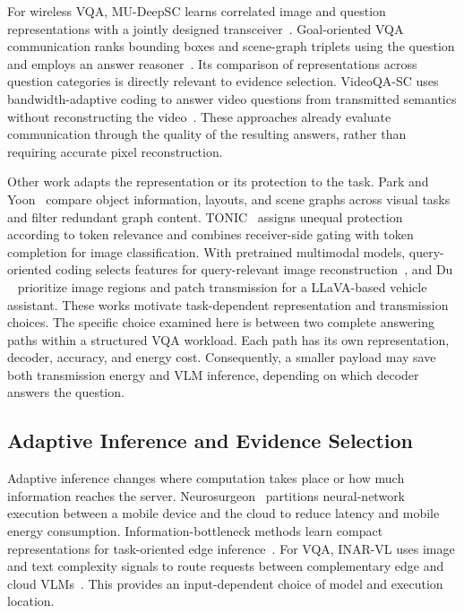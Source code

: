 For wireless VQA, MU-DeepSC learns correlated image and question
representations with a jointly designed
transceiver~\cite{xie2022mudeepscwcl,xie2021mudeepsc}.
Goal-oriented VQA communication ranks bounding boxes and scene-graph
triplets using the question and employs an answer
reasoner~\cite{liu2024gosg}. Its comparison of representations across
question categories is directly relevant to evidence selection.
VideoQA-SC uses bandwidth-adaptive coding to answer video questions
from transmitted semantics without reconstructing the
video~\cite{guo2025videoqasc}. These approaches already evaluate
communication through the quality of the resulting answers, rather
than requiring accurate pixel reconstruction.

Other work adapts the representation or its protection to the task.
Park and Yoon~\cite{park2025transmit} compare object information,
layouts, and scene graphs across visual tasks and filter redundant
graph content. TONIC~\cite{liu2026tonic} assigns unequal protection
according to token relevance and combines receiver-side gating with
token completion for image classification. With pretrained multimodal
models, query-oriented coding selects features for query-relevant image
reconstruction~\cite{huang2026query}, and Du
\etal~\cite{jiang2025lmmvn} prioritize image regions and patch
transmission for a LLaVA-based vehicle assistant. These works motivate
task-dependent representation and transmission choices. The specific
choice examined here is between two complete answering paths within
a structured VQA workload. Each path has its own representation,
decoder, accuracy, and energy cost. Consequently, a smaller payload
may save both transmission energy and VLM inference, depending on
which decoder answers the question.

\subsection{Adaptive Inference and Evidence Selection}
Adaptive inference changes where computation takes place or how much
information reaches the server. Neurosurgeon~\cite{kang2017neurosurgeon}
partitions neural-network execution between a mobile device and the
cloud to reduce latency and mobile energy consumption. Information-bottleneck
methods learn compact representations for task-oriented edge
inference~\cite{shao2022taskoriented}. For VQA, INAR-VL
uses image and text complexity signals to route requests between
complementary edge and cloud VLMs~\cite{sabanovic2026inarvl}.
This provides an input-dependent choice of model and execution location.

